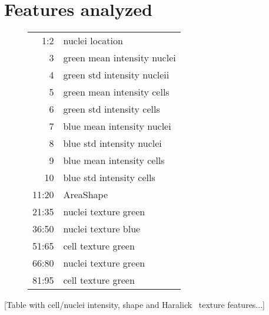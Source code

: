 \documentclass[oneside, a4paper, draft]{memoir} %
\begin{document}
\nocite{duda2001pattern}


\appendix
\chapter{Features analyzed}\label{app:featurelist}
\begin{figure}[here]
\centering
\begin{tabular}{rl}
	1:2 & nuclei location\\

	3 & green mean intensity nuclei\\
	4 & green std intensity nucleii\\

	5 & green mean intensity cells\\
	6 & green std intensity cells\\

	7 & blue mean intensity nuclei\\
	8 & blue std intensity nuclei\\

	9 & blue mean intensity cells\\
	10 & blue std intensity cells\\

	11:20 & AreaShape\\


	21:35 & nuclei texture green\\
	36:50 & nuclei texture blue\\
	51:65 & cell texture green\\

	66:80 & nuclei texture green\\
	81:95 & cell texture green
\end{tabular}
\end{figure}
[Table with cell/nuclei intensity, shape and Haralick~\cite{haralick1973textural} texture features...]
\end{document}
